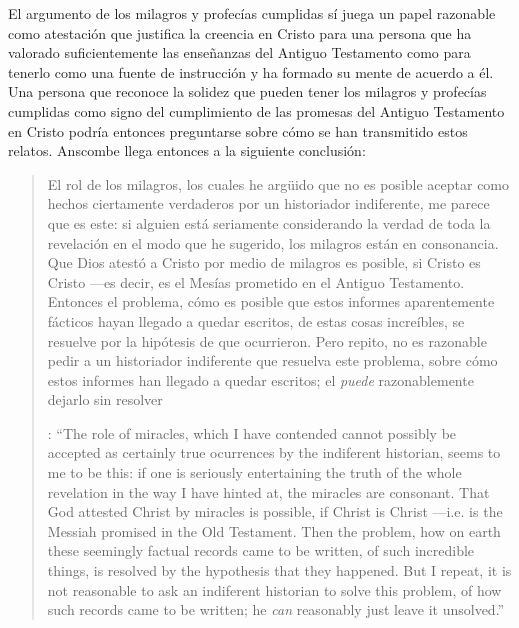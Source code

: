 El argumento de los milagros y profecías cumplidas sí juega un papel razonable como atestación que justifica la creencia en Cristo para una persona que ha valorado suficientemente las enseñanzas del Antiguo Testamento como para tenerlo como una fuente de instrucción y ha formado su mente de acuerdo a él. Una persona que reconoce la solidez que pueden tener los milagros y profecías cumplidas como signo del cumplimiento de las promesas del Antiguo Testamento en Cristo podría entonces preguntarse sobre cómo se han transmitido estos relatos. Anscombe llega entonces a la siguiente conclusión: \blockquote[{\cite[37]{anscombe2008faith:prophandmi}}: \enquote{The role of miracles, which I have contended cannot possibly be accepted as certainly true ocurrences by the indiferent historian, seems to me to be this: if one is seriously entertaining the truth of the whole revelation in the way I have hinted at, the miracles are consonant. That God attested Christ by miracles is possible, if Christ is Christ ---i.e. is the Messiah promised in the Old Testament. Then the problem, how on earth these seemingly factual records came to be written, of such incredible things, is resolved by the hypothesis that they happened. \textelp{} But I repeat, it is not reasonable to ask an indiferent historian to solve this problem, of how such records came to be written; he \emph{can} reasonably just leave it unsolved.}]{El rol de los milagros, los cuales he argüido que no es posible aceptar como hechos ciertamente verdaderos por un historiador indiferente, me parece que es este: si alguien está seriamente considerando la verdad de toda la revelación en el modo que he sugerido, los milagros están en consonancia. Que Dios atestó a Cristo por medio de milagros es posible, si Cristo es Cristo ---es decir, es el Mesías prometido en el Antiguo Testamento. Entonces el problema, cómo es posible que estos informes aparentemente fácticos hayan llegado a quedar escritos, de estas cosas increíbles, se resuelve por la hipótesis de que ocurrieron. \textelp{} Pero repito, no es razonable pedir a un historiador indiferente que resuelva este problema, sobre cómo estos informes han llegado a quedar escritos; el \emph{puede} razonablemente dejarlo sin resolver}.

